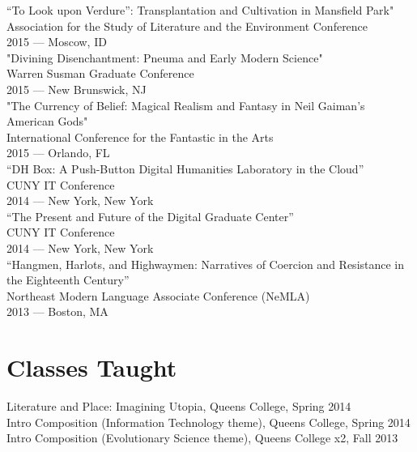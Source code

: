 \documentclass[11pt]{article}
\begin{document}
“To Look upon Verdure”: Transplantation and Cultivation in Mansfield Park"\\
Association for the Study of Literature and the Environment Conference\\
2015 — Moscow, ID\\

"Divining Disenchantment: Pneuma and Early Modern Science"\\
Warren Susman Graduate Conference\\
2015 — New Brunswick, NJ\\

"The Currency of Belief: Magical Realism and Fantasy in Neil Gaiman’s American Gods"\\
International Conference for the Fantastic in the Arts\\
2015 — Orlando, FL\\

“DH Box: A Push-Button Digital Humanities Laboratory in the Cloud”\\
CUNY IT Conference\\
2014 — New York, New York\\

“The Present and Future of the Digital Graduate Center”\\
CUNY IT Conference\\
2014 — New York, New York\\

“Hangmen, Harlots, and Highwaymen: Narratives of Coercion and Resistance in the Eighteenth Century”\\
Northeast Modern Language Associate Conference (NeMLA)\\
2013 — Boston, MA\\

\section*{Classes Taught}
\label{sec:orgheadline8}

Literature and Place: Imagining Utopia, Queens College, Spring 2014\\
Intro Composition (Information Technology theme), Queens College, Spring 2014\\
Intro Composition (Evolutionary Science theme), Queens College  x2, Fall 2013\\
\end{document}
